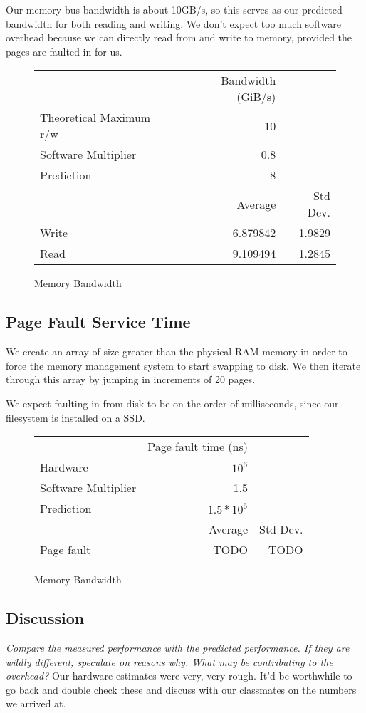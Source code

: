 \documentclass[letterpaper,twocolumn,10pt]{article}
\begin{document}
Our memory bus bandwidth is about 10GB/s, so this serves as our predicted
bandwidth for both reading and writing. We don't expect too much software
overhead because we can directly read from and write to memory, provided the
pages are faulted in for us.

\begin{figure}
	\centering
    \begin{tabular}{l r r}
      & Bandwidth (GiB/s)\\
      Theoretical Maximum r/w & 10\\
      Software Multiplier & 0.8 \\
      Prediction & 8\\
                   & Average & Std Dev.\\
      Write & 6.879842 & 1.9829 \\
      Read\protect\footnotemark & 9.109494  & 1.2845
\end{tabular}
\caption{Memory Bandwidth}
\label{tab:memorybandwidth}
\end{figure}
\subsection{Page Fault Service Time}
We create an array of size greater than the physical RAM memory in order to
force the memory management system to start swapping to disk. We then iterate 
through this array by jumping in increments of 20 pages.

We expect faulting in from disk to be on the order of milliseconds, since our
filesystem is installed on a SSD.

\begin{figure}
	\centering
    \begin{tabular}{l r r}
      & Page fault time (ns) \\
      Hardware & $10^6$\\
      Software Multiplier & 1.5 \\
      Prediction & $1.5 * 10^6$ \\
                   & Average & Std Dev.\\
      Page fault & TODO & TODO \\
\end{tabular}
\caption{Memory Bandwidth}
\label{tab:memorybandwidth}
\end{figure}

\subsection{Discussion}
\textit{Compare the measured performance with the predicted performance. If they are wildly different, speculate on reasons why. What may be contributing to the overhead?}
    Our hardware estimates were very, very rough. It'd be worthwhile to go back and double check these and discuss with our classmates on the numbers we arrived at.
\end{document}
